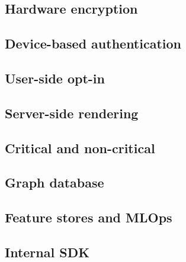 \subsection{Hardware encryption}
\label{chapter4-hardware-encryption}

\subsection{Device-based authentication}
\label{chapter4-device-based-authentication}

\subsection{User-side opt-in}
\label{chapter4-user-side-opt-in}

\subsection{Server-side rendering}
\label{chapter4-server-side-rendering}

\subsection{Critical and non-critical}
\label{chapter4-critical-and-non-critical}

\subsection{Graph database}
\label{chapter4-graph-database}

\subsection{Feature stores and MLOps}
\label{chapter4-feature-stores-and-mlops}


\subsection{Internal SDK}
\label{chapter4-internal-sdk}
